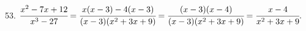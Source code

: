 53. $\cfrac{x^2-7x+12}{x^3-27}=\cfrac{x(x-3)-4(x-3)}{(x-3)(x^2+3x+9)}=\cfrac{(x-3)(x-4)}{(x-3)(x^2+3x+9)}=\cfrac{x-4}{x^2+3x+9}.$\\
